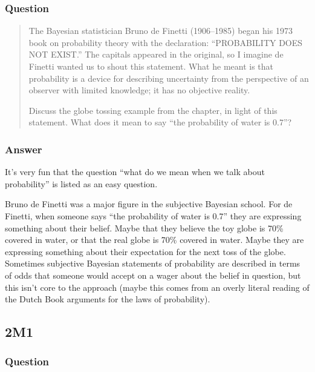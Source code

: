 \documentclass[
]{book}
\begin{document}
\hypertarget{question-3}{%
\subsubsection*{Question}\label{question-3}}

\begin{quote}
The Bayesian statistician Bruno de Finetti (1906--1985) began his 1973 book on probability theory with the declaration: ``PROBABILITY DOES NOT EXIST.'' The capitals appeared in the original, so I imagine de Finetti wanted us to shout this statement. What he meant is that probability is a device for describing uncertainty from the perspective of an observer with limited knowledge; it has no objective reality.

Discuss the globe tossing example from the chapter, in light of this statement. What does it mean to say ``the probability of water is 0.7''?
\end{quote}

\hypertarget{answer-3}{%
\subsubsection*{Answer}\label{answer-3}}

It's very fun that the question ``what do we mean when we talk about probability'' is listed as an easy question.

Bruno de Finetti was a major figure in the subjective Bayesian school. For de Finetti, when someone says ``the probability of water is 0.7'' they are expressing something about their belief. Maybe that they believe the toy globe is 70\% covered in water, or that the real globe is 70\% covered in water. Maybe they are expressing something about their expectation for the next toss of the globe. Sometimes subjective Bayesian statements of probability are described in terms of odds that someone would accept on a wager about the belief in question, but this isn't core to the approach (maybe this comes from an overly literal reading of the Dutch Book arguments for the laws of probability).

\hypertarget{m1}{%
\subsection*{2M1}\label{m1}}

\hypertarget{question-4}{%
\subsubsection*{Question}\label{question-4}}
\end{document}
